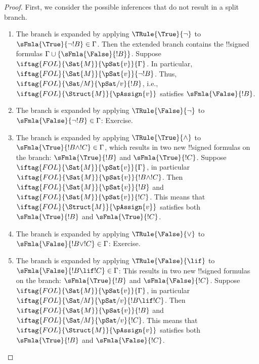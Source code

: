 \documentclass[../../../include/open-logic-section]{subfiles}
\begin{document}
\begin{proof}
First, we consider the possible inferences that do not result in a split branch.
\begin{enumerate}
\item The branch is expanded by applying $\TRule{\True}{\lnot}$ to
  $\sFmla{\True}{\lnot !B} \in \Gamma$. Then the extended branch
  contains the !!{signed formula}s $\Gamma \cup
  \{\sFmla{\False}{!B}\}$.  Suppose
  $\iftag{FOL}{\Sat{M}}{\pSat{v}}{\Gamma}$. In particular,
  $\iftag{FOL}{\Sat{M}}{\pSat{v}}{\lnot !B}$. Thus,
  $\iftag{FOL}{\Sat/{M}}{\pSat/{v}}{!B}$, i.e.,
  $\iftag{FOL}{\Struct{M}}{\pAssign{v}}$ satisfies
  $\sFmla{\False}{!B}$.
\item The branch is expanded by applying $\TRule{\False}{\lnot}$ to
  $\sFmla{\False}{\lnot !B} \in \Gamma$: Exercise.
\item The branch is expanded by applying $\TRule{\True}{\land}$ to
  $\sFmla{\True}{!B \land !C} \in \Gamma$, which results in two new
  !!{signed formula}s on the branch: $\sFmla{\True}{!B}$ and
  $\sFmla{\True}{!C}$. Suppose
  $\iftag{FOL}{\Sat{M}}{\pSat{v}}{\Gamma}$, in particular
  $\iftag{FOL}{\Sat{M}}{\pSat{v}}{!B \land !C}$. Then
  $\iftag{FOL}{\Sat{M}}{\pSat{v}}{!B}$ and
  $\iftag{FOL}{\Sat{M}}{\pSat{v}}{!C}$. This means that
  $\iftag{FOL}{\Struct{M}}{\pAssign{v}}$ satisfies both
  $\sFmla{\True}{!B}$ and $\sFmla{\True}{!C}$.
\item The branch is expanded by applying $\TRule{\False}{\lor}$ to
  $\sFmla{\False}{!B \lor !C} \in \Gamma$: Exercise.
\item The branch is expanded by applying $\TRule{\False}{\lif}$ to
  $\sFmla{\False}{!B \lif !C} \in \Gamma$: This results in two new
  !!{signed formula}s on the branch: $\sFmla{\True}{!B}$ and
  $\sFmla{\False}{!C}$. Suppose
  $\iftag{FOL}{\Sat{M}}{\pSat{v}}{\Gamma}$, in particular
  $\iftag{FOL}{\Sat/{M}}{\pSat/{v}}{!B \lif !C}$. Then
  $\iftag{FOL}{\Sat{M}}{\pSat{v}}{!B}$ and
  $\iftag{FOL}{\Sat/{M}}{\pSat/{v}}{!C}$. This means that
  $\iftag{FOL}{\Struct{M}}{\pAssign{v}}$ satisfies both
  $\sFmla{\True}{!B}$ and $\sFmla{\False}{!C}$.

\end{enumerate}
\end{proof}
\end{document}
